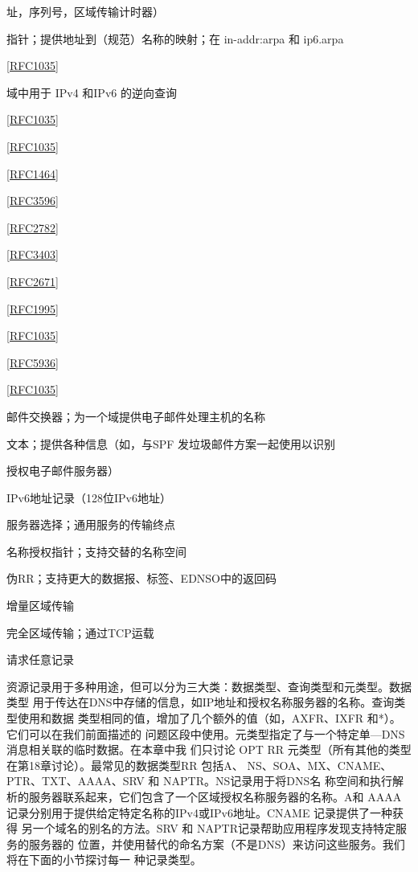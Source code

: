址，序列号，区域传输计时器）

指针；提供地址到（规范）名称的映射；在 in-addr:arpa 和 ip6.arpa

\href{https://www.rfc-editor.org/rfc/rfc1035}{[RFC1035]}

域中用于 IPv4 和IPv6 的逆向查询

\href{https://www.rfc-editor.org/rfc/rfc1035}{[RFC1035]}

\href{https://www.rfc-editor.org/rfc/rfc1035}{[RFC1035]}

\href{https://www.rfc-editor.org/rfc/rfc1464}{[RFC1464]}

\href{https://www.rfc-editor.org/rfc/rfc3596}{[RFC3596]}

\href{https://www.rfc-editor.org/rfc/rfc2782}{[RFC2782]}

\href{https://www.rfc-editor.org/rfc/rfc3403}{[RFC3403]}

\href{https://www.rfc-editor.org/rfc/rfc2671}{[RFC2671]}

\href{https://www.rfc-editor.org/rfc/rfc1995}{[RFC1995]}

\href{https://www.rfc-editor.org/rfc/rfc1035}{[RFC1035]}

\href{https://www.rfc-editor.org/rfc/rfc5936}{[RFC5936]}

\href{https://www.rfc-editor.org/rfc/rfc1035}{[RFC1035]}

邮件交换器；为一个域提供电子邮件处理主机的名称

文本；提供各种信息（如，与SPF 发垃圾邮件方案一起使用以识别

授权电子邮件服务器）

IPv6地址记录（128位IPv6地址）

服务器选择；通用服务的传输终点

名称授权指针；支持交替的名称空间

伪RR；支持更大的数据报、标签、EDNSO中的返回码

增量区域传输

完全区域传输；通过TCP运载

请求任意记录

资源记录用于多种用途，但可以分为三大类：数据类型、查询类型和元类型。数据类型
用于传达在DNS中存储的信息，如IP地址和授权名称服务器的名称。查询类型使用和数据
类型相同的值，增加了几个额外的值（如，AXFR、IXFR 和*）。它们可以在我们前面描述的
问题区段中使用。元类型指定了与一个特定单—DNS 消息相关联的临时数据。在本章中我
们只讨论 OPT RR 元类型（所有其他的类型在第18章讨论）。最常见的数据类型RR 包括A、
NS、SOA、MX、CNAME、PTR、TXT、AAAA、SRV 和 NAPTR。NS记录用于将DNS名
称空间和执行解析的服务器联系起来，它们包含了一个区域授权名称服务器的名称。A和
AAAA记录分别用于提供给定特定名称的IPv4或IPv6地址。CNAME 记录提供了一种获得
另一个域名的别名的方法。SRV 和 NAPTR记录帮助应用程序发现支持特定服务的服务器的
位置，并使用替代的命名方案（不是DNS）来访问这些服务。我们将在下面的小节探讨每一
种记录类型。

